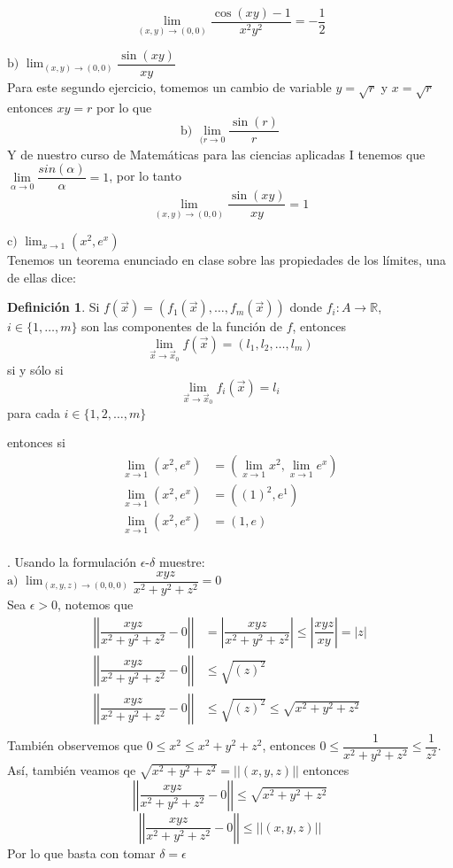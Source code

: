 \documentclass[letterpaper]{article}
\providecommand{\abs}[1]{\left|#1\right|}
\providecommand{\norm}[1]{\left|\left|#1\right|\right|}
\newcommand{\R}{\mathds{R}}
\renewcommand{\*}{\cdot}
\theoremstyle{definition}
\newtheorem{definition}{Definición}
\begin{document}
$$\displaystyle\lim_{(x,y) \to (0,0)} \dfrac{\cos(xy) - 1}{x^2y^2} = -\dfrac{1}{2}$$

\noindent$\text{b) }\displaystyle\lim_{(x,y) \to (0,0)} \dfrac{\sin(xy) }{xy}$\\
Para este segundo ejercicio, tomemos un cambio de variable $ y =\sqrt{r}  $ y $ x = \sqrt{r} $ entonces $ xy = r $ por lo que
$$\text{b) }\displaystyle\lim_{(r\to 0} \dfrac{\sin(r) }{r}$$
Y de nuestro curso de Matemáticas para las ciencias aplicadas I tenemos que $ \lim\limits_{\alpha \to 0} \dfrac{sin(\alpha)}{\alpha} = 1 $, por lo tanto
$$\displaystyle\lim_{(x,y) \to (0,0)} \dfrac{\sin(xy) }{xy} = 1$$

$\text{c) }\displaystyle\lim_{x \to 1} (x^2 , e^x) $\\[0.5cm]
Tenemos un teorema enunciado en clase sobre las propiedades de los límites, una de ellas dice:
\begin{definition}
	Si $ f(\vec{x}) = (f_1(\vec{x}), \dots, f_m(\vec{x})) $ donde $ f_i:A \to \R  $, $ i \in \{ 1, \dots, m \} $  son las componentes de la función de $ f $, entonces 
	\[ \lim\limits_{\vec{x} \to \vec{x}_0 } f(\vec{x}) = (l_1, l_2, \dots, l_m) \] si y sólo si\[ \lim\limits_{\vec{x} \to \vec{x}_0} f_i(\vec{x}) = l_i \] para cada $ i \in \{ 1, 2, \dots, m \} $
\end{definition}
entonces si
\begin{align*}
	\lim_{x \to 1} (x^2 , e^x) &=\left( \lim_{x \to 1} x^2, \lim_{x \to 1} e^x \right)\\
	\lim_{x \to 1} (x^2 , e^x) &=\left( (1)^2,  e^{1} \right)\\
	\lim_{x \to 1} (x^2 , e^x) &=\left( 1,  e \right)\\
\end{align*}

.  Usando la formulación $\epsilon$-$\delta$ muestre: \\

\noindent$ \text{a) } \displaystyle\lim_{(x,y,z) \to (0,0,0)} \dfrac{xyz}{x^2 + y^2 + z^2} = 0$\\

Sea $ \epsilon > 0 $, notemos que 
\begin{align*}
	\norm{\dfrac{xyz}{x^2 + y^2 + z^2} - 0} &= \abs{\dfrac{xyz}{x^2 + y^2 + z^2} } \leq \abs{ \dfrac{xyz}{xy}  }  = \abs{z}\\
	\norm{\dfrac{xyz}{x^2 + y^2 + z^2} - 0} & \leq \sqrt{(z)^2}\\
	\norm{\dfrac{xyz}{x^2 + y^2 + z^2} - 0} & \leq \sqrt{(z)^2}\leq \sqrt{x^2 + y^2 + z^2} \\
\end{align*}
También observemos que $ 0 \leq x^2 \leq x^2 + y^2 + z^2$, entonces $ 0 \leq \dfrac{1}{x^2 + y^2 + z^2} \leq \dfrac{1}{z^2} $.\\
Así, también veamos qe $ \sqrt{x^2 + y^2 + z^2}  = \norm{(x,y,z)} $ entonces
\[ \norm{\dfrac{xyz}{x^2 + y^2 + z^2} - 0} \leq \sqrt{x^2 + y^2 + z^2} \]
\[ \norm{\dfrac{xyz}{x^2 + y^2 + z^2} - 0} \leq \norm{(x,y,z)} \]
Por lo que basta con tomar $ \delta = \epsilon $
\end{document}
